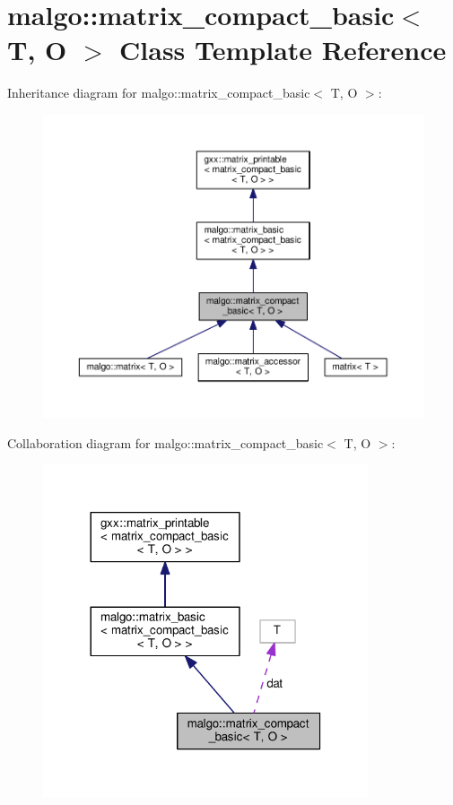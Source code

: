 \hypertarget{classmalgo_1_1matrix__compact__basic}{}\section{malgo\+:\+:matrix\+\_\+compact\+\_\+basic$<$ T, O $>$ Class Template Reference}
\label{classmalgo_1_1matrix__compact__basic}


Inheritance diagram for malgo\+:\+:matrix\+\_\+compact\+\_\+basic$<$ T, O $>$\+:
\nopagebreak
\begin{figure}[H]
\begin{center}
\leavevmode
\includegraphics[width=350pt]{classmalgo_1_1matrix__compact__basic__inherit__graph}
\end{center}
\end{figure}


Collaboration diagram for malgo\+:\+:matrix\+\_\+compact\+\_\+basic$<$ T, O $>$\+:
\nopagebreak
\begin{figure}[H]
\begin{center}
\leavevmode
\includegraphics[width=272pt]{classmalgo_1_1matrix__compact__basic__coll__graph}
\end{center}
\end{figure}
